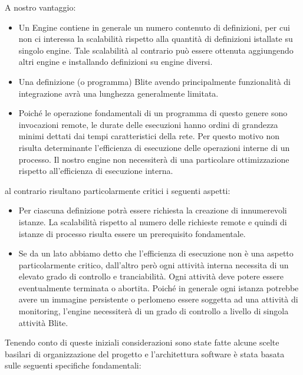 A nostro vantaggio:
\begin{itemize}
  \item Un Engine contiene in generale un numero contenuto di definizioni, per
  cui non ci interessa la scalabilità rispetto alla quantità di definizioni
  istallate su singolo engine. Tale scalabilità al contrario può essere
  ottenuta aggiungendo altri engine e installando definizioni su engine diversi.
  
  \item  Una definizione (o programma) Blite avendo principalmente funzionalità
  di integrazione avrà una lunghezza generalmente limitata. 
  
  \item Poiché le operazione fondamentali di un programma di questo genere
  sono invocazioni remote, le durate delle esecuzioni hanno ordini di grandezza
  minimi dettati dai tempi caratteristici della rete. Per questo motivo non
  risulta determinante l'efficienza di esecuzione delle operazioni interne di un
  processo. Il nostro engine non necessiterà di una particolare ottimizzazione 
  rispetto all'efficienza di esecuzione interna.
\end{itemize}

al contrario risultano particolarmente critici i seguenti aspetti:
\begin{itemize}
  \item Per ciascuna definizione potrà essere richiesta la creazione di
  innumerevoli istanze. La scalabilità rispetto al numero delle
  richieste remote e quindi di istanze di processo risulta essere un
  prerequisito fondamentale.
  
  \item Se da un lato abbiamo detto che l'efficienza di esecuzione non \`e 
  una aspetto particolarmente critico, dall'altro per\`o ogni attività interna
  necessita di un elevato grado di controllo e tranciabilità. Ogni attività deve
  potere essere eventualmente terminata o abortita. Poiché in generale
  \footnotetext{} ogni istanza potrebbe avere un immagine persistente o
  perlomeno essere soggetta ad una attività di monitoring, l'engine necessiterà
  di un grado di controllo a livello di singola attività Blite.
\end{itemize}

Tenendo conto di queste iniziali considerazioni sono state fatte alcune scelte
basilari di organizzazione del progetto e l'architettura software \`e stata
basata sulle seguenti specifiche fondamentali:

